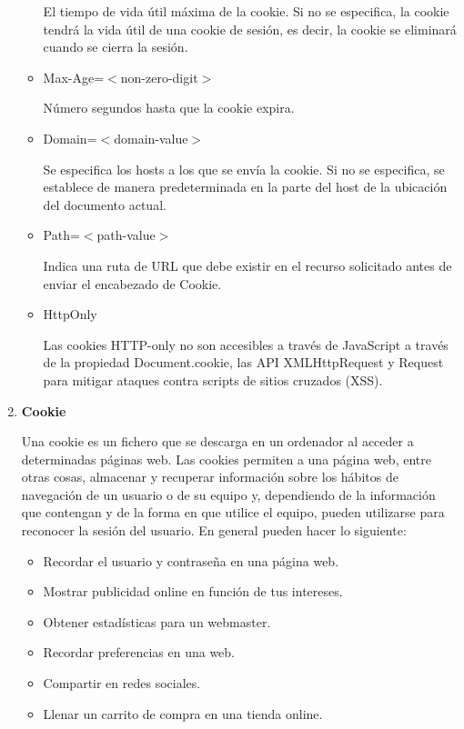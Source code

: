 \documentclass[a4paper,12pt]{article}
\begin{document}
\begin{enumerate}
\begin{itemize}
  El tiempo de vida útil máxima de la cookie. Si no se especifica, la cookie tendrá la vida útil de una cookie de sesión, es decir, la cookie se eliminará cuando se cierra
  la sesión.
  
  \item Max-Age=$<$non-zero-digit$>$
  
  Número segundos hasta que la cookie expira.
  
  \item Domain=$<$domain-value$>$
  
  Se especifica los hosts a los que se envía la cookie. Si no se especifica, se establece de manera predeterminada en la parte del host de la ubicación del documento actual.
  
  \item Path=$<$path-value$>$
  
  Indica una ruta de URL que debe existir en el recurso solicitado antes de enviar el encabezado de Cookie.
  
  \item HttpOnly
  
  Las cookies HTTP-only no son accesibles a través de JavaScript a través de la propiedad Document.cookie, las API XMLHttpRequest y Request para mitigar ataques contra scripts de sitios cruzados (XSS).
 \end{itemize}

 \item \textbf{Cookie}
 
 Una cookie es un fichero que se descarga en un ordenador al acceder a determinadas páginas web. Las cookies permiten a una página web, entre otras cosas,
 almacenar y recuperar información sobre los hábitos de navegación de un usuario o de su equipo y, dependiendo de la información que contengan y de la forma en que
 utilice el equipo, pueden utilizarse para reconocer la sesión del usuario. En general pueden hacer lo siguiente:
 
 \begin{itemize}
  \item Recordar el usuario y contraseña en una página web.
  \item Mostrar publicidad online en función de tus intereses.
  \item Obtener estadísticas para un webmaster.
  \item Recordar preferencias en una web.
  \item Compartir en redes sociales.
  \item Llenar un carrito de compra en una tienda online.
 \end{itemize}


\end{enumerate}
\end{document}
